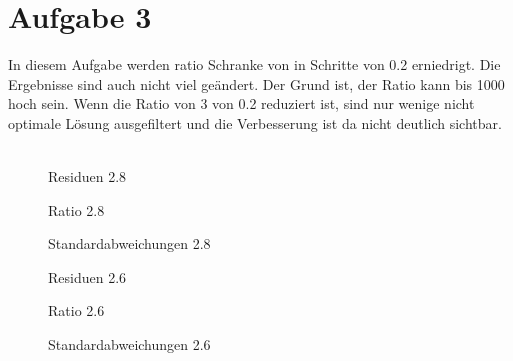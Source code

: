 \section{Aufgabe 3}
In diesem Aufgabe werden ratio Schranke von in Schritte von 0.2 erniedrigt. Die Ergebnisse sind auch nicht viel geändert. Der Grund ist, der Ratio kann bis 1000 hoch sein. Wenn die Ratio von 3 von 0.2 reduziert ist, sind nur wenige nicht optimale Lösung ausgefiltert und die Verbesserung ist da nicht deutlich sichtbar.\\\\
\begin{figure}[ht]\centering  
	\caption{Residuen 2.8}
	\label{fig:resieuen28}
\end{figure}
\begin{figure}[ht]\centering 
	\caption{Ratio 2.8}
	\label{fig:ratio28}
\end{figure}
\begin{figure}[ht]\centering 
	\caption{Standardabweichungen 2.8}
	\label{fig:std28}
\end{figure}
\begin{figure}[ht]\centering  
	\caption{Residuen 2.6}
	\label{fig:resieuen26}
\end{figure}
\begin{figure}[ht]\centering 
	\caption{Ratio 2.6}
	\label{fig:ratio26}
\end{figure}
\begin{figure}[ht]\centering 
	\caption{Standardabweichungen 2.6}
	\label{fig:std26111111}
\end{figure}